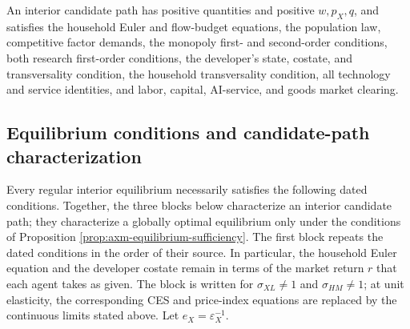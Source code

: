 \begin{definition}
An interior candidate path has positive quantities and positive \(w,p_X,q\), and
satisfies the household Euler and flow-budget equations, the population law,
competitive factor demands, the monopoly first- and second-order conditions,
both research first-order conditions, the developer's state, costate, and
transversality condition, the household transversality condition, all technology
and service identities, and labor, capital, AI-service, and goods market clearing.
\end{definition}

\subsection{Equilibrium conditions and candidate-path characterization}

Every regular interior equilibrium necessarily satisfies the following dated
conditions. Together, the three blocks below characterize an interior candidate
path; they characterize a globally optimal equilibrium only under the conditions
of Proposition \ref{prop:axm-equilibrium-sufficiency}. The first block repeats
the dated conditions in the order of their source. In particular, the household
Euler equation and the developer costate remain in terms of the market return
\(r\) that each agent takes as given. The block is written for
\(\sigma_{XL}\neq1\) and
\(\sigma_{HM}\neq1\); at unit
elasticity, the corresponding CES and price-index equations are replaced by the
continuous limits stated above. Let \(e_X=\varepsilon_X^{-1}\).

